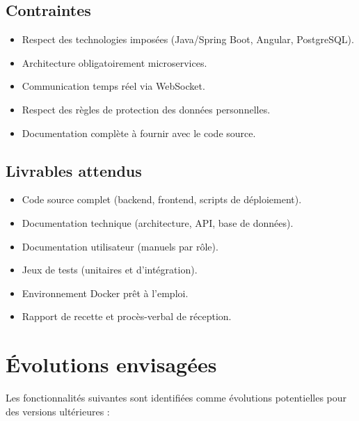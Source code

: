 \documentclass[12pt,a4paper]{article}
\begin{document}
\subsection{Contraintes}

\begin{itemize}[leftmargin=*,itemsep=4pt]
    \item Respect des technologies imposées (Java/Spring Boot, Angular, PostgreSQL).
    \item Architecture obligatoirement microservices.
    \item Communication temps réel via WebSocket.
    \item Respect des règles de protection des données personnelles.
    \item Documentation complète à fournir avec le code source.
\end{itemize}

\subsection{Livrables attendus}

\begin{itemize}[leftmargin=*,itemsep=4pt]
    \item Code source complet (backend, frontend, scripts de déploiement).
    \item Documentation technique (architecture, API, base de données).
    \item Documentation utilisateur (manuels par rôle).
    \item Jeux de tests (unitaires et d'intégration).
    \item Environnement Docker prêt à l'emploi.
    \item Rapport de recette et procès-verbal de réception.
\end{itemize}

\newpage

\section{Évolutions envisagées}

Les fonctionnalités suivantes sont identifiées comme évolutions potentielles pour des versions ultérieures :
\end{document}
